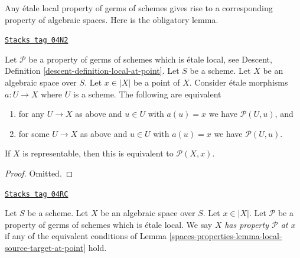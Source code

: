 Any \'etale local property of germs of schemes gives rise to a corresponding
property of algebraic spaces. Here is the obligatory lemma.

\begin{lemma}
\label{spaces-properties-lemma-local-source-target-at-point}
\href{https://stacks.math.columbia.edu/tag/04N2}{\texttt{Stacks tag 04N2}}

Let $\mathcal{P}$ be a property of germs of schemes which is \'etale local, see
Descent, Definition \ref{descent-definition-local-at-point}.
Let $S$ be a scheme.
Let $X$ be an algebraic space over $S$.
Let $x \in |X|$ be a point of $X$.
Consider \'etale morphisms $a : U \to X$ where $U$ is a scheme.
The following are equivalent
\begin{enumerate}
\item for any $U \to X$ as above and $u \in U$ with $a(u) = x$ we have
$\mathcal{P}(U, u)$, and
\item for some $U \to X$ as above and $u \in U$ with $a(u) = x$ we have
$\mathcal{P}(U, u)$.
\end{enumerate}
If $X$ is representable, then this is equivalent to $\mathcal{P}(X, x)$.
\end{lemma}

\begin{proof}
Omitted.
\end{proof}

\begin{definition}
\label{spaces-properties-definition-property-at-point}
\href{https://stacks.math.columbia.edu/tag/04RC}{\texttt{Stacks tag 04RC}}

Let $S$ be a scheme. Let $X$ be an algebraic space over $S$.
Let $x \in |X|$. Let $\mathcal{P}$ be a property of germs of schemes which is
\'etale local.
We say $X$ {\it has property $\mathcal{P}$ at $x$} if any of the
equivalent conditions of
Lemma \ref{spaces-properties-lemma-local-source-target-at-point}
hold.
\end{definition}

